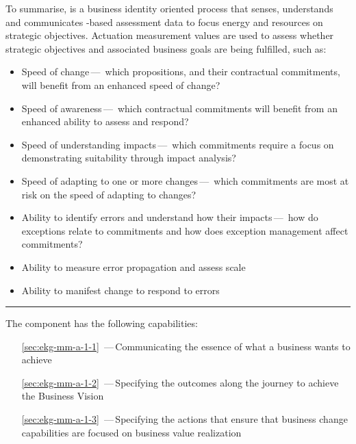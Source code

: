 To summarise, \textbf{} is a business identity oriented process
that senses, understands and communicates -based assessment data to focus energy and
resources on strategic objectives.
Actuation measurement values are used to assess whether strategic objectives and associated business goals are
being fulfilled, such as:

\begin{itemize}
    \item Speed of change\,---\,%
    which propositions, and their contractual commitments, will benefit from an enhanced speed of change?

    \item Speed of awareness\,---\,%
    which contractual commitments will benefit from an enhanced ability to assess and respond?

    \item Speed of understanding impacts\,---\,%
    which commitments require a focus on demonstrating suitability through impact analysis?

    \item Speed of adapting to one or more changes\,---\,%
    which commitments are most at risk on the speed of adapting to changes?

    \item Ability to identify errors and understand how their impacts\,---\,%
          how do exceptions relate to commitments and how does exception management affect commitments?
    \item Ability to measure error propagation and assess scale
    \item Ability to manifest change to respond to errors
\end{itemize}

\vspace{1cm}
\hrule

The  component has the following capabilities:

\begin{itemize}[leftmargin=.5in]
  \item [\ref{sec:ekg-mm-a-1-1}] \,---\,Communicating the essence of what a business wants to achieve
  \item [\ref{sec:ekg-mm-a-1-2}] \,---\,Specifying the outcomes along the journey to achieve the Business Vision
  \item [\ref{sec:ekg-mm-a-1-3}] \,---\,Specifying the actions that ensure that business change capabilities are focused on business value realization
\end{itemize}




%
